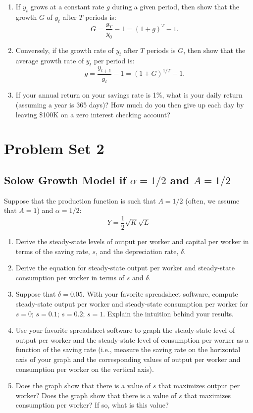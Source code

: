 \documentclass[]{book}
\theoremstyle{definition}
\theoremstyle{definition}
\theoremstyle{definition}
\theoremstyle{remark}
\begin{document}
\begin{enumerate}
\def\labelenumi{\arabic{enumi}.}
\item
  If \(y_t\) grows at a constant rate \(g\) during a given period, then
  show that the growth \(G\) of \(y_t\) after \(T\) periods is:
  \[G = \frac{y_T}{y_0}-1=(1+g)^T-1.\]
\item
  Conversely, if the growth rate of \(y_t\) after \(T\) periods is
  \(G\), then show that the average growth rate of \(y_t\) per period
  is: \[g = \frac{y_{t+1}}{y_{t}}-1=(1+G)^{1/T}-1.\]
\item
  If your annual return on your savings rate is 1\%, what is your daily
  return (assuming a year is 365 days)? How much do you then give up
  each day by leaving \$100K on a zero interest checking account?
\end{enumerate}

\hypertarget{pset2}{\chapter{Problem Set 2}\label{pset2}}

\section{\texorpdfstring{Solow Growth Model if \(\alpha = 1/2\) and
\(A=1/2\)}{Solow Growth Model if \textbackslash{}alpha = 1/2 and A=1/2}}\label{solow-growth-model-if-alpha-12-and-a12}

Suppose that the production function is such that \(A=1/2\) (often, we
assume that \(A=1\)) and \(\alpha=1/2\):
\[Y=\frac{1}{2}\sqrt{K}\sqrt{L}\]

\begin{enumerate}
\def\labelenumi{\arabic{enumi}.}
\item
  Derive the steady-state levels of output per worker and capital per
  worker in terms of the saving rate, \(s\), and the depreciation rate,
  \(\delta\).
\item
  Derive the equation for steady-state output per worker and
  steady-state consumption per worker in terms of \(s\) and \(\delta\).
\item
  Suppose that \(\delta=0.05\). With your favorite spreadsheet software,
  compute steady-state output per worker and steady-state consumption
  per worker for \(s=0\); \(s=0.1\); \(s=0.2\); \(s=1\). Explain the
  intuition behind your results.
\item
  Use your favorite spreadsheet software to graph the steady-state level
  of output per worker and the steady-state level of consumption per
  worker as a function of the saving rate (i.e., measure the saving rate
  on the horizontal axis of your graph and the corresponding values of
  output per worker and consumption per worker on the vertical axis).
\item
  Does the graph show that there is a value of \(s\) that maximizes
  output per worker? Does the graph show that there is a value of \(s\)
  that maximizes consumption per worker? If so, what is this value?
\end{enumerate}
\end{document}
